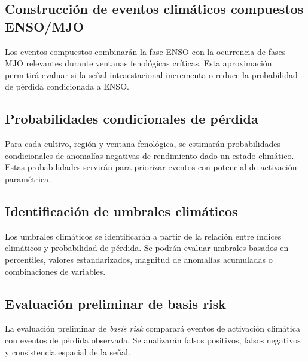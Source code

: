 
\subsection{Construcción de eventos climáticos compuestos ENSO/MJO}

Los eventos compuestos combinarán la fase ENSO con la ocurrencia de fases MJO relevantes durante ventanas fenológicas críticas. Esta aproximación permitirá evaluar si la señal intraestacional incrementa o reduce la probabilidad de pérdida condicionada a ENSO.


\subsection{Probabilidades condicionales de pérdida}

Para cada cultivo, región y ventana fenológica, se estimarán probabilidades condicionales de anomalías negativas de rendimiento dado un estado climático. Estas probabilidades servirán para priorizar eventos con potencial de activación paramétrica.


\subsection{Identificación de umbrales climáticos}

Los umbrales climáticos se identificarán a partir de la relación entre índices climáticos y probabilidad de pérdida. Se podrán evaluar umbrales basados en percentiles, valores estandarizados, magnitud de anomalías acumuladas o combinaciones de variables.


\subsection{Evaluación preliminar de basis risk}

La evaluación preliminar de \textit{basis risk} comparará eventos de activación climática con eventos de pérdida observada. Se analizarán falsos positivos, falsos negativos y consistencia espacial de la señal.

